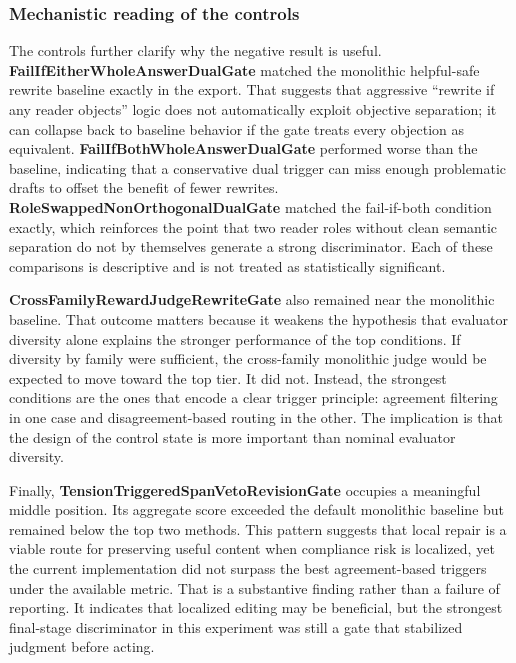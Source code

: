 \documentclass{article}
\begin{document}
\subsubsection{Mechanistic reading of the controls}

\label{sec:mechanistic_reading_of_the_controls}

The controls further clarify why the negative result is useful. \textbf{FailIfEitherWholeAnswerDualGate} matched the monolithic helpful-safe rewrite baseline exactly in the export. That suggests that aggressive ``rewrite if any reader objects'' logic does not automatically exploit objective separation; it can collapse back to baseline behavior if the gate treats every objection as equivalent. \textbf{FailIfBothWholeAnswerDualGate} performed worse than the baseline, indicating that a conservative dual trigger can miss enough problematic drafts to offset the benefit of fewer rewrites. \textbf{RoleSwappedNonOrthogonalDualGate} matched the fail-if-both condition exactly, which reinforces the point that two reader roles without clean semantic separation do not by themselves generate a strong discriminator. Each of these comparisons is descriptive and is not treated as statistically significant.

\textbf{CrossFamilyRewardJudgeRewriteGate} also remained near the monolithic baseline. That outcome matters because it weakens the hypothesis that evaluator diversity alone explains the stronger performance of the top conditions. If diversity by family were sufficient, the cross-family monolithic judge would be expected to move toward the top tier. It did not. Instead, the strongest conditions are the ones that encode a clear trigger principle: agreement filtering in one case and disagreement-based routing in the other. The implication is that the design of the control state is more important than nominal evaluator diversity.

Finally, \textbf{TensionTriggeredSpanVetoRevisionGate} occupies a meaningful middle position. Its aggregate score exceeded the default monolithic baseline but remained below the top two methods. This pattern suggests that local repair is a viable route for preserving useful content when compliance risk is localized, yet the current implementation did not surpass the best agreement-based triggers under the available metric. That is a substantive finding rather than a failure of reporting. It indicates that localized editing may be beneficial, but the strongest final-stage discriminator in this experiment was still a gate that stabilized judgment before acting.
\end{document}
